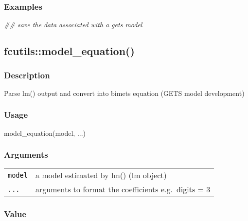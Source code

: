 \documentclass[
  letterpaper,
  DIV=11,
  numbers=noendperiod]{scrreport}
\newenvironment{Shaded}{\begin{snugshade}}{\end{snugshade}}
\newcommand{\DocumentationTok}[1]{\textcolor[rgb]{0.37,0.37,0.37}{\textit{#1}}}
\newcommand{\FunctionTok}[1]{\textcolor[rgb]{0.28,0.35,0.67}{#1}}
\newcommand{\NormalTok}[1]{\textcolor[rgb]{0.00,0.23,0.31}{#1}}
\begin{document}
\subsubsection{Examples}\label{examples-85}

\begin{Shaded}
\begin{Highlighting}[]
\DocumentationTok{\#\# save the data associated with a gets model}
\end{Highlighting}
\end{Shaded}

\subsection{fcutils::model\_equation()}\label{fcutilsmodel_equation}

\subsubsection{Description}\label{description-87}

Parse lm() output and convert into bimets equation (GETS model
development)

\subsubsection{Usage}\label{usage-87}

\begin{Shaded}
\begin{Highlighting}[]
\FunctionTok{model\_equation}\NormalTok{(model, ...)}
\end{Highlighting}
\end{Shaded}

\subsubsection{Arguments}\label{arguments-87}

\begin{longtable}[]{@{}ll@{}}
\toprule\noalign{}
\endhead
\bottomrule\noalign{}
\endlastfoot
\texttt{model} & a model estimated by lm() (lm object) \\
\texttt{...} & arguments to format the coefficients e.g.~digits = 3 \\
\end{longtable}

\subsubsection{Value}\label{value-74}
\end{document}
